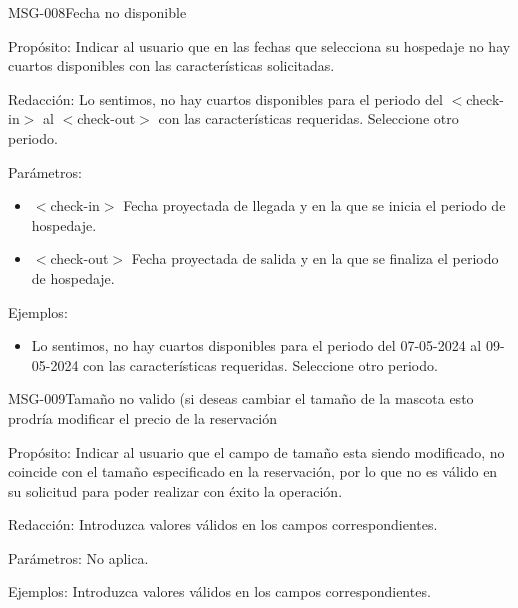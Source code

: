 \begin{cdtMessage}[msgErrorColor]{MSG-008}{Fecha no disponible} 
	\item[Propósito:] Indicar al usuario que en las fechas que selecciona su hospedaje no hay cuartos disponibles con las características solicitadas.
	\item[Redacción:] Lo sentimos, no hay cuartos disponibles para el periodo del $<$check-in$>$ al $<$check-out$>$ con las características requeridas. Seleccione otro periodo. 
	\item[Parámetros:] \hspace{1cm}
	\begin{itemize}
		\item $<$check-in$>$ Fecha proyectada de llegada y en la que se inicia el periodo de hospedaje.
		\item $<$check-out$>$ Fecha proyectada de salida y en la que se finaliza el periodo de hospedaje.
	\end{itemize}
	\item[Ejemplos:] \hspace{1cm}
	\begin{itemize}
		\item Lo sentimos, no hay cuartos disponibles para el periodo del 07-05-2024 al 09-05-2024 con las características requeridas. Seleccione otro periodo. 
	\end{itemize}
\end{cdtMessage}
\begin{cdtMessage}[msgErrorColor]{MSG-009}{Tamaño no valido (si deseas cambiar el tamaño de la mascota esto prodría modificar el precio de la reservación}
	\item[Propósito:] Indicar al usuario que el campo de tamaño esta siendo modificado, no coincide con el tamaño especificado en la reservación, por lo que no es válido en su solicitud para poder realizar con éxito la operación.
	\item[Redacción:] Introduzca valores válidos en los campos correspondientes.
	\item[Parámetros:] No aplica.
	\item[Ejemplos:] Introduzca valores válidos en los campos correspondientes.
\end{cdtMessage}

